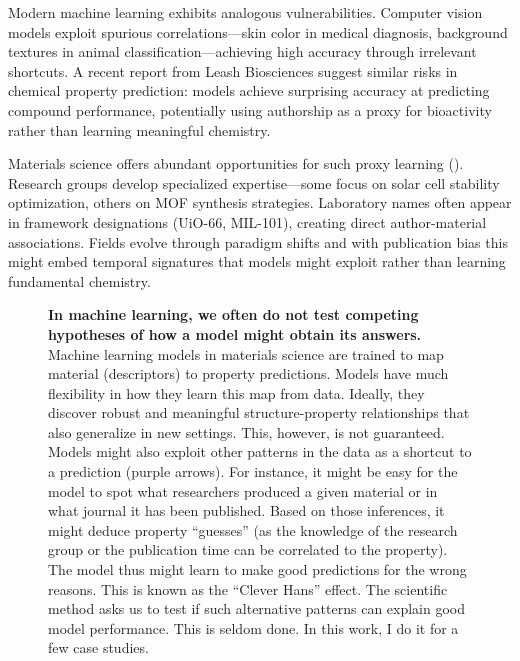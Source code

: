 \documentclass[11pt, oneside]{article}
\begin{document}
Modern machine learning exhibits analogous vulnerabilities. 
Computer vision models exploit spurious correlations---skin color in medical diagnosis,\autocite{pooch2019trust} background textures in animal classification\autocites{xiao2020noise}---achieving high accuracy through irrelevant shortcuts.\autocite{Brown2023, Howard2021} 
A recent report from Leash Biosciences suggest similar risks in chemical property prediction: models achieve surprising accuracy at predicting compound performance, potentially using authorship as a proxy for bioactivity rather than learning meaningful chemistry.\autocite{leash} 

Materials science offers abundant opportunities for such proxy learning (). 
Research groups develop specialized expertise---some focus on solar cell stability optimization, others on MOF synthesis strategies. Laboratory names often appear in framework designations (UiO-66, MIL-101), creating direct author-material associations. 
Fields evolve through paradigm shifts\autocite{kuhn1997structure} and with publication bias this might embed temporal signatures that models might exploit rather than learning fundamental chemistry.

\begin{figure}[!htb]
	\centering 
	
	\caption{\textbf{In machine learning, we often do not test competing hypotheses of how a model might obtain its answers.} Machine learning models in materials science are trained to map material (descriptors) to property predictions. Models have much flexibility in how they learn this map from data. Ideally, they discover robust and meaningful structure-property relationships that also generalize in new settings. This, however, is not guaranteed. Models might also exploit other patterns in the data as a shortcut to a prediction (purple arrows). For instance, it might be easy for the model to spot what researchers produced a given material or in what journal it has been published. Based on those inferences, it might deduce property \enquote{guesses} (as the knowledge of the research group or the publication time can be correlated to the property). The model thus might learn to make good predictions for the wrong reasons. This is known as the \enquote{Clever Hans} effect. The scientific method asks us to test if such alternative patterns can explain good model performance. This is seldom done. In this work, I do it for a few case studies. }	
	\label{fig:clever_hans}
\end{figure}
\end{document}
